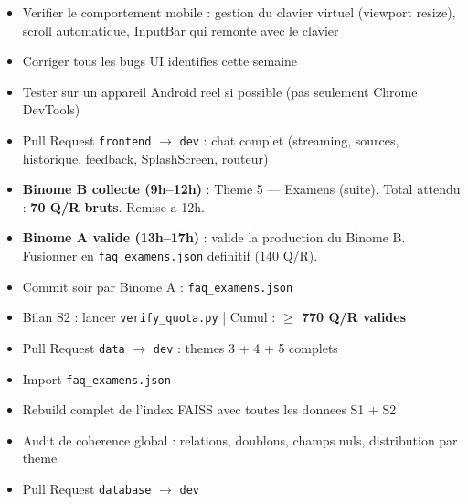 \documentclass[11pt,a4paper]{article}
\begin{document}
\begin{reactbox}[Frontend --- J10]
\begin{itemize}
    \item[$\square$] Verifier le comportement mobile : gestion du clavier virtuel (viewport resize), scroll automatique, InputBar qui remonte avec le clavier
    \item[$\square$] Corriger tous les bugs UI identifies cette semaine
    \item[$\square$] Tester sur un appareil Android reel si possible (pas seulement Chrome DevTools)
    \item[$\square$] Pull Request \texttt{frontend} $\rightarrow$ \texttt{dev} : chat complet (streaming, sources, historique, feedback, SplashScreen, routeur)
\end{itemize}
\end{reactbox}

\begin{databox}[Data --- J10]
\begin{itemize}
    \item[$\square$] \textbf{Binome B collecte (9h--12h)} : Theme 5 --- Examens (suite). Total attendu : \textbf{70 Q/R bruts}. Remise a 12h.
    \item[$\square$] \textbf{Binome A valide (13h--17h)} : valide la production du Binome B. Fusionner en \texttt{faq\_examens.json} definitif (140 Q/R).
    \item[$\square$] Commit soir par Binome A : \texttt{faq\_examens.json}
    \item[$\square$] Bilan S2 : lancer \texttt{verify\_quota.py} | Cumul : \textbf{$\geq$ 770 Q/R valides}
    \item[$\square$] Pull Request \texttt{data} $\rightarrow$ \texttt{dev} : themes 3 + 4 + 5 complets
\end{itemize}
\end{databox}

\begin{dbbox}
\begin{itemize}
    \item[$\square$] Import \texttt{faq\_examens.json}
    \item[$\square$] Rebuild complet de l'index FAISS avec toutes les donnees S1 + S2
    \item[$\square$] Audit de coherence global : relations, doublons, champs nuls, distribution par theme
    \item[$\square$] Pull Request \texttt{database} $\rightarrow$ \texttt{dev}
\end{itemize}
\end{dbbox}
\end{document}
